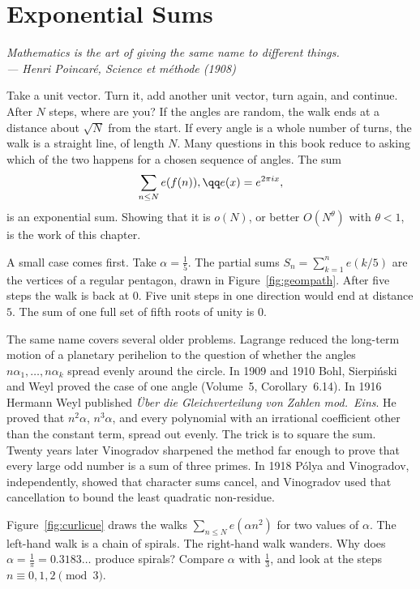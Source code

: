 \chapter{Exponential Sums}\label{ch:sums}

\begin{center}\itshape
Mathematics is the art of giving the same name to different things.\\
\upshape --- Henri Poincaré, \emph{Science et méthode} (1908)
\end{center}

Take a unit vector. Turn it, add another unit vector, turn again, and continue. After $N$ steps, where are you? If the angles are random, the walk ends at a distance about $\sqrt N$ from the start. If every angle is a whole number of turns, the walk is a straight line, of length $N$. Many questions in this book reduce to asking which of the two happens for a chosen sequence of angles. The sum
\[
\sum_{n\le N}e(f(n)),\qq e(x)=e^{2\pi ix},
\]
is an exponential sum. Showing that it is $o(N)$, or better $O(N^\theta)$ with $\theta<1$, is the work of this chapter.

A small case comes first. Take $\alpha=\frac15$. The partial sums $S_n=\sum_{k=1}^n e(k/5)$ are the vertices of a regular pentagon, drawn in Figure~\ref{fig:geompath}. After five steps the walk is back at $0$. Five unit steps in one direction would end at distance $5$. The sum of one full set of fifth roots of unity is $0$.

The same name covers several older problems. Lagrange reduced the long-term motion of a planetary perihelion to the question of whether the angles $n\alpha_1,\dots,n\alpha_k$ spread evenly around the circle. In 1909 and 1910 Bohl, Sierpiński and Weyl proved the case of one angle (Volume~5, Corollary~6.14). In 1916 Hermann Weyl published \emph{Über die Gleichverteilung von Zahlen mod.\ Eins}. He proved that $n^2\alpha$, $n^3\alpha$, and every polynomial with an irrational coefficient other than the constant term, spread out evenly. The trick is to square the sum. Twenty years later Vinogradov sharpened the method far enough to prove that every large odd number is a sum of three primes. In 1918 Pólya and Vinogradov, independently, showed that character sums cancel, and Vinogradov used that cancellation to bound the least quadratic non-residue.

\begin{think}
Figure~\ref{fig:curlicue} draws the walks $\sum_{n\le N}e(\alpha n^2)$ for two values of $\alpha$. The left-hand walk is a chain of spirals. The right-hand walk wanders. Why does $\alpha=\frac1\pi=0.3183\ldots$ produce spirals? Compare $\alpha$ with $\frac13$, and look at the steps $n\equiv0,1,2\pmod3$.
\end{think}

